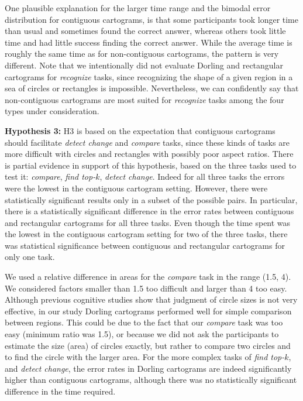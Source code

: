 \documentclass[10pt,journal,compsoc]{IEEEtran}
\begin{document}
One plausible explanation for the larger time range and the bimodal error distribution for contiguous cartograms, is that some participants took longer time than usual and sometimes found the correct answer, whereas others took little time and had little success finding the correct answer. While the average time is roughly the same time as for non-contiguous cartograms, the pattern is very different. Note that we intentionally did not evaluate Dorling and rectangular cartograms for  \textit{recognize} tasks, since recognizing the shape of a given region in a sea of circles or rectangles is impossible. Nevertheless, we can confidently say that non-contiguous cartograms are most suited for  \textit{recognize} tasks among the four types under consideration.
 

\medskip
\noindent
\textbf{Hypothesis 3:}
H3 is based on the expectation that contiguous cartograms should facilitate \textit{detect change} and \textit{compare} tasks, since these kinds of tasks are more difficult with circles and rectangles with possibly poor aspect ratios. There is partial evidence in support of this hypothesis, based on the three tasks used to test it: \textit{compare}, \textit{find top-$k$}, \textit{detect change}. 
Indeed for all three tasks the errors were the lowest in the contiguous cartogram setting. However, there were statistically significant results only in a subset of the possible pairs. 
In particular, there is a statistically significant difference in the error rates between contiguous and rectangular cartograms for all three tasks. 
 Even though the time spent was the lowest in the contiguous cartogram setting for two of the three tasks, there was statistical significance between contiguous and rectangular cartograms for only one task.
 
We used a relative difference in areas for the \textit{compare} task in the range (1.5, 4). We considered factors smaller than 1.5 too difficult and larger than 4 too easy. 
Although previous cognitive studies show that judgment of circle sizes is not very effective, in our study Dorling cartograms performed well for simple comparison between regions. This could be due to the fact that our \textit{compare} task was too easy (minimum ratio was 1.5), or because we did not ask the participants to estimate the size (area) of circles exactly, but rather to compare two circles and to find the circle with the larger area. 
For the more complex tasks of \textit{find top-$k$}, and \textit{detect change}, the error rates in Dorling cartograms are indeed significantly higher than contiguous cartograms, although there was no statistically significant difference in the time required.
\end{document}
